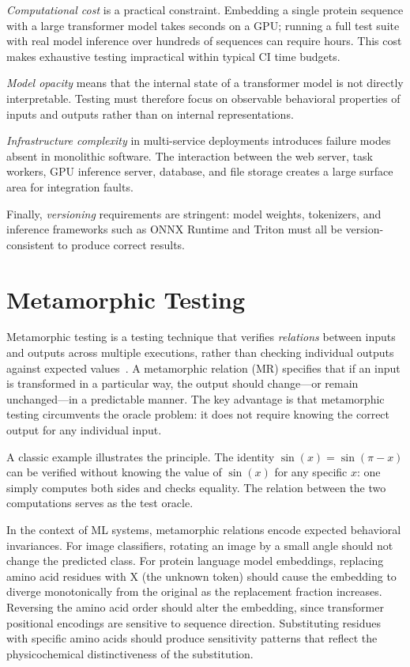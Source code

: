 \emph{Computational cost} is a practical constraint. Embedding a single protein sequence with a large transformer model takes seconds on a \ac{GPU}; running a full test suite with real model inference over hundreds of sequences can require hours. This cost makes exhaustive testing impractical within typical \ac{CI} time budgets.

\emph{Model opacity} means that the internal state of a transformer model is not directly interpretable. Testing must therefore focus on observable behavioral properties of inputs and outputs rather than on internal representations.

\emph{Infrastructure complexity} in multi-service deployments introduces failure modes absent in monolithic software. The interaction between the web server, task workers, \ac{GPU} inference server, database, and file storage creates a large surface area for integration faults.

Finally, \emph{versioning} requirements are stringent: model weights, tokenizers, and inference frameworks such as \ac{ONNX} Runtime and Triton must all be version-consistent to produce correct results.

\section{Metamorphic Testing}\label{sec:metamorphic-testing}

Metamorphic testing is a testing technique that verifies \emph{relations} between inputs and outputs across multiple executions, rather than checking individual outputs against expected values~\cite{chen1998metamorphic}. A metamorphic relation (MR) specifies that if an input is transformed in a particular way, the output should change---or remain unchanged---in a predictable manner. The key advantage is that metamorphic testing circumvents the oracle problem: it does not require knowing the correct output for any individual input.

A classic example illustrates the principle. The identity $\sin(x) = \sin(\pi - x)$ can be verified without knowing the value of $\sin(x)$ for any specific $x$: one simply computes both sides and checks equality. The relation between the two computations serves as the test oracle.

In the context of \ac{ML} systems, metamorphic relations encode expected behavioral invariances. For image classifiers, rotating an image by a small angle should not change the predicted class. For protein language model embeddings, replacing amino acid residues with X (the unknown token) should cause the embedding to diverge monotonically from the original as the replacement fraction increases. Reversing the amino acid order should alter the embedding, since transformer positional encodings are sensitive to sequence direction. Substituting residues with specific amino acids should produce sensitivity patterns that reflect the physicochemical distinctiveness of the substitution.

